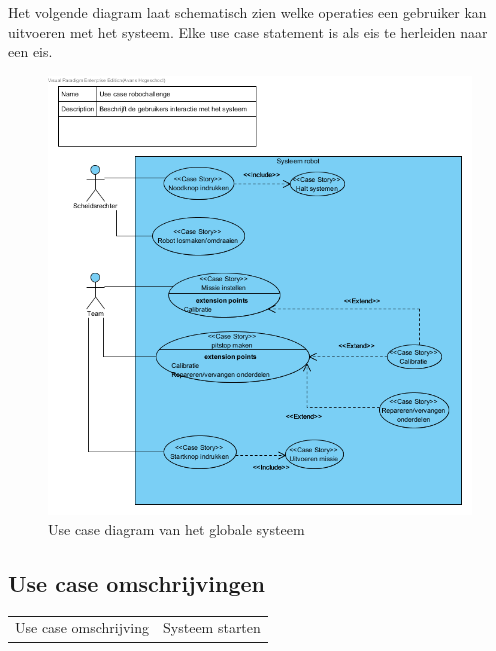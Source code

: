 \documentclass[12pt]{article} %
\begin{document}
Het volgende diagram laat schematisch zien welke operaties een gebruiker kan uitvoeren met het systeem. Elke use case statement is als eis te herleiden naar een eis.
\begin{center}
\begin{figure}
\includegraphics[scale=.9]{usecase.png}
\caption{Use case diagram van het globale systeem}
\label{fig:usecase}
\end{figure}
\end{center}
\clearpage

\subsection{Use case omschrijvingen}

\begin{table}[h]
\begin{tabular}{ll}
Use case omschrijving & Systeem starten \\


\end{tabular}
\end{table}

\newpage

\end{document}
